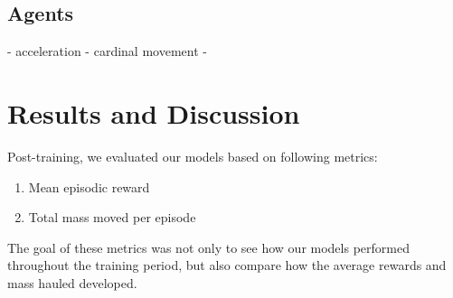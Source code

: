 \documentclass[conference]{IEEEtran}
\begin{document}
\subsection{Agents}
- acceleration
- cardinal movement
- 


\section{Results and Discussion}
Post-training, we evaluated our models based on following metrics:

\begin{enumerate}
	\item Mean episodic reward
	\item Total mass moved per episode
\end{enumerate}

The goal of these metrics was not only to see how our models performed throughout the training period, but also compare how the average rewards and mass hauled developed.
\end{document}
